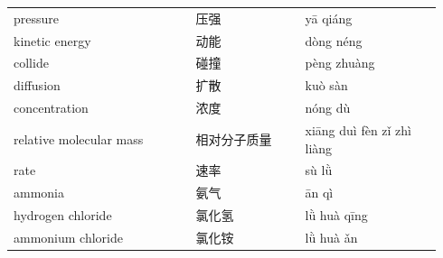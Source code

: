 \documentclass[11pt]{article}
\begin{document}
\begin{longtable}{@{}p{0.40\linewidth}p{0.24\linewidth}p{0.30\linewidth}@{}}
pressure & 压强 & yā qiáng \\
kinetic energy & 动能 & dòng néng \\
collide & 碰撞 & pèng zhuàng \\
diffusion & 扩散 & kuò sàn \\
concentration & 浓度 & nóng dù \\
relative molecular mass & 相对分子质量 & xiāng duì fèn zǐ zhì liàng \\
rate & 速率 & sù lǜ \\
ammonia & 氨气 & ān qì \\
hydrogen chloride & 氯化氢 & lǜ huà qīng \\
ammonium chloride & 氯化铵 & lǜ huà ǎn \\
\end{longtable}
\end{document}
